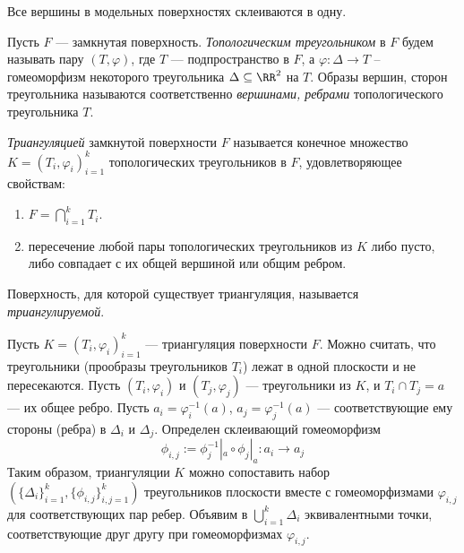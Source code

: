 \documentclass[12pt,a4paper]{article}
\begin{document}
    \begin{remark*}
        Все вершины в модельных поверхностях склеиваются в одну.
    \end{remark*}

    \begin{definition}
        Пусть $F$ --- замкнутая поверхность. \emph{Топологическим треугольником} в $F$ будем называть пару $(T, \varphi)$, где $T$ --- подпространство в $F$, а $\varphi: \Delta \to T$ – гомеоморфизм некоторого треугольника $\Delta \subseteq \RR^2$ на $T$. Образы вершин, сторон треугольника называются соответственно \emph{вершинами, ребрами} топологического треугольника $T$.
    \end{definition}

    \begin{definition}
        \emph{Триангуляцией} замкнутой поверхности $F$ называется конечное множество $K = {(T_i, \varphi_i)}_{i=1}^k$ топологических треугольников в $F$, удовлетворяющее свойствам:
        \begin{enumerate}
            \item $F = \bigcap_{i=1}^k T_i$.
            \item пересечение любой пары топологических треугольников из $K$ либо пусто, либо совпадает с их общей вершиной или общим ребром.
        \end{enumerate}
        Поверхность, для которой существует триангуляция, называется \emph{триангулируемой}.
    \end{definition}

    \begin{remark}
        Пусть $K = {(T_i, \varphi_i)}_{i=1}^k$ --- триангуляция поверхности $F$. Можно считать, что треугольники (прообразы треугольников $T_i$) лежат в одной плоскости и не пересекаются. Пусть $(T_i, \varphi_i)$ и $(T_j,\varphi_j)$ --- треугольники из $K$, и $T_i\cap T_j = a$ --- их общее ребро. Пусть $a_i = \varphi_i^{-1}(a)$, $a_j = \varphi_j^{-1}(a)$ --- соответствующие ему стороны (ребра) в $\Delta_i$ и $\Delta_j$. Определен склеивающий гомеоморфизм
        \[\phi_{i, j} := \phi_j^{-1} |_a \circ \phi_j |_a: a_i \to a_j\]
        Таким образом, триангуляции $K$ можно сопоставить набор $(\{\Delta_i\}_{i=1}^k, \{\phi_{i, j}\}_{i, j = 1}^k)$ треугольников плоскости вместе с гомеоморфизмами $\varphi_{i, j}$ для соответствующих пар ребер. Объявим в $\bigcup_{i=1}^k \Delta_i$ эквивалентными точки, соответствующие друг другу при гомеоморфизмах $\varphi_{i, j}$.
    \end{remark}
\end{document}
